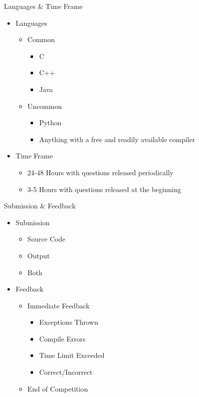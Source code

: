 \documentclass{beamer}
\begin{document}
\begin{frame}{Languages \& Time Frame}
  \begin{centering}
    \begin{itemize}
      \item Languages
      \begin{itemize}
        \item Common
        \begin{itemize}
          \item C
          \item C++
          \item Java
        \end{itemize}
        \item Uncommon
        \begin{itemize}
          \item Python
          \item Anything with a free and readily available compiler
        \end{itemize}
      \end{itemize}
      \pause
      \item Time Frame
      \begin{itemize}
        \item 24-48 Hours with questions released periodically
        \item 3-5 Hours with questions released at the beginning
      \end{itemize}
    \end{itemize}
  \end{centering}
\end{frame}

\begin{frame}{Submission \& Feedback}
  \begin{centering}
    \begin{itemize}
      \item Submission
      \begin{itemize}
        \item Source Code
        \item Output
        \item Both
      \end{itemize}
      \pause
      \item Feedback
      \begin{itemize}
        \item Immediate Feedback
        \begin{itemize}
          \item Exceptions Thrown
          \item Compile Errors
          \item Time Limit Exceeded
          \item Correct/Incorrect
        \end{itemize}
        \item End of Competition
      \end{itemize}
    \end{itemize}
  \end{centering}
\end{frame}
\end{document}
